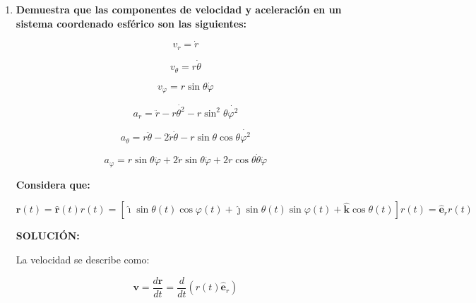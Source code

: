 \documentclass[12pt,a4paper]{article}
\begin{document}
\begin{enumerate}
    \item \textbf{Demuestra que las componentes de velocidad y aceleración en un sistema coordenado esférico son las siguientes:}
    
    \begin{equation*}
        v_r = \dot{r}
    \end{equation*}
    
     \begin{equation*}
         v_\theta = r \dot{\theta}
     \end{equation*}
     
     \begin{equation*}
         v_\varphi = r \sin{\theta} \dot{\varphi}
     \end{equation*}
     
     \begin{equation*}
         a_r = \ddot{r} - r \dot{\theta^2} - r \sin^2{\theta}\dot{\varphi^2}
     \end{equation*}
     
     \begin{equation*}
         a_\theta = r\ddot{\theta} - 2\dot{r}\dot{\theta} - r \sin{\theta} \cos{\theta} \dot{\varphi^2}
     \end{equation*}
     
     \begin{equation*}
         a_\varphi = r \sin{\theta} \ddot{\varphi}+ 2 \dot{r}\sin{\theta}\dot{\varphi} + 2 r \cos{\theta} \dot{\theta} \dot{\varphi}
     \end{equation*}
     
     \textbf{Considera que:}
     
     \begin{equation*}
         \mathbf{r}(t) = \hat{\mathbf{r}}(t) r(t) = [\boldsymbol{\hat{\imath}} \sin{\theta(t)} \cos{\varphi(t)}+ \boldsymbol{\hat{\jmath}} \sin{\theta(t)} \sin{\varphi(t)} + \hat{\mathbf{k}} \cos{\theta(t)}]r(t) = \hat{\mathbf{e}}_r r(t)
     \end{equation*}
     
     \textbf{SOLUCIÓN:}
     
     La velocidad se describe como:
     
     \begin{equation*}
         \mathbf{v} = \frac{d \mathbf{r}}{dt} = \frac{d}{dt}(r(t)\hat{\mathbf{e}}_r)
     \end{equation*}
     

\end{enumerate}
\end{document}
